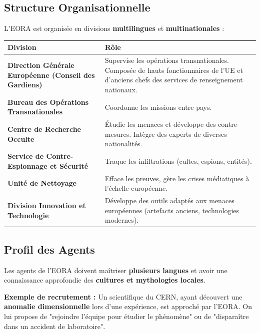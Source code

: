 \documentclass[10pt,a5paper,twoside]{book}
\begin{document}
\newpage

\subsection{Structure Organisationnelle}
L'EORA est organisée en divisions \textbf{multilingues} et \textbf{multinationales} :

\begin{center}
\begin{tabular}{|>{\bfseries}P{4cm}|P{7cm}|}
	\hline
	\textbf{Division}										&	\textbf{Rôle} \\ \hline
	Direction Générale Européenne (Conseil des Gardiens)	&	Supervise les opérations transnationales. Composée de hauts fonctionnaires de l'UE et d'anciens chefs des services de renseignement nationaux. \\ \hline
	Bureau des Opérations Transnationales					&	Coordonne les missions entre pays. \\ \hline
	Centre de Recherche Occulte								&	Étudie les menaces et développe des contre-mesures. Intègre des experts de diverses nationalités. \\ \hline
	Service de Contre-Espionnage et Sécurité				&	Traque les infiltrations (cultes, espions, entités). \\ \hline
	Unité de Nettoyage										&	Efface les preuves, gère les crises médiatiques à l'échelle européenne. \\ \hline
	Division Innovation et Technologie						&	Développe des outils adaptés aux menaces européennes (artefacts anciens, technologies modernes). \\ \hline
	\end{tabular}
\end{center}

\subsection{Profil des Agents}

Les agents de l'EORA doivent maîtriser \textbf{plusieurs langues} et avoir une connaissance approfondie des \textbf{cultures et mythologies locales}.

\begin{shaded}
	\textbf{Exemple de recrutement :}
	Un scientifique du CERN, ayant découvert une \textbf{anomalie dimensionnelle} lors d'une expérience, est approché par l'EORA. On lui propose de "rejoindre l'équipe pour étudier le phénomène" ou de "disparaître dans un accident de laboratoire".
\end{shaded}
\end{document}

